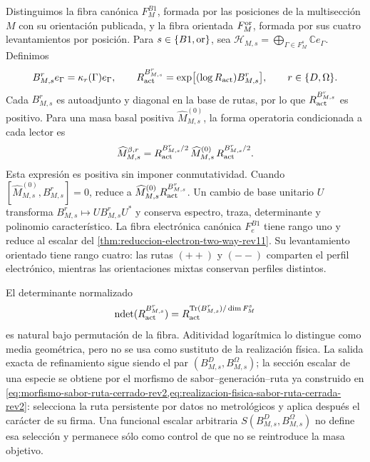 Distinguimos la fibra canónica \(F_M^{B1}\), formada por las posiciones de
la multisección \(M\) con su orientación publicada, y la fibra orientada
\(F_M^{\rm or}\), formada por sus cuatro levantamientos por posición. Para
\(s\in\{B1,{\rm or}\}\), sea
\(\mathcal H_{M,s}=\bigoplus_{\Gamma\in F_M^s}\mathbb C e_\Gamma\). Definimos
\begin{equation}
 B_{M,s}^r e_\Gamma=\kappa_r(\Gamma)e_\Gamma,
 \qquad
 R_{\rm act}^{B_{M,s}^r}
 =\exp\bigl[(\log R_{\rm act})B_{M,s}^r\bigr],
 \qquad r\in\{D,\Omega\}.
 \label{eq:operadores-fibra-two-way-rev11}
\end{equation}
Cada \(B_{M,s}^r\) es autoadjunto y diagonal en la base de rutas, por lo que
\(R_{\rm act}^{B_{M,s}^r}\) es positivo. Para una masa basal positiva
\(\widehat M_{M,s}^{(0)}\), la forma operatoria condicionada a cada lector es
\begin{equation}
 \widehat M_{M,s}^{\beta,r}
 =R_{\rm act}^{B_{M,s}^r/2}\,
  \widehat M_{M,s}^{(0)}\,
  R_{\rm act}^{B_{M,s}^r/2}.
 \label{eq:ley-operatoria-fibra-rev11}
\end{equation}
Esta expresión es positiva sin imponer conmutatividad. Cuando
\([\widehat M_{M,s}^{(0)},B_{M,s}^r]=0\), reduce a
\(\widehat M_{M,s}^{(0)}R_{\rm act}^{B_{M,s}^r}\).
Un cambio de base unitario \(U\) transforma
\(B_{M,s}^r\mapsto UB_{M,s}^rU^*\) y conserva espectro, traza, determinante y
polinomio característico. La fibra electrónica canónica \(F_e^{B1}\) tiene
rango uno y reduce al escalar del
\cref{thm:reduccion-electron-two-way-rev11}.
Su levantamiento orientado tiene rango cuatro: las rutas \((++)\) y \((--)\)
comparten el perfil electrónico, mientras las orientaciones mixtas conservan
perfiles distintos.

El determinante normalizado
\[
 \operatorname{ndet}(R_{\rm act}^{B_{M,s}^r})
 =R_{\rm act}^{\operatorname{Tr}(B_{M,s}^r)/\dim F_M^s}
\]
es natural bajo permutación de la fibra. Aditividad logarítmica lo distingue
como media geométrica, pero no se usa como sustituto de la realización física.
La salida exacta de refinamiento sigue siendo el par
\((B_{M,s}^D,B_{M,s}^\Omega)\); la sección escalar de una especie se obtiene
por el morfismo de sabor--generación--ruta ya construido en
\cref{eq:morfismo-sabor-ruta-cerrado-rev2,eq:realizacion-fisica-sabor-ruta-cerrada-rev2}:
selecciona la ruta persistente por datos no metrológicos y aplica después el
carácter de su firma. Una funcional escalar arbitraria
\(S(B_{M,s}^D,B_{M,s}^\Omega)\) no define esa selección y permanece sólo como
control de que no se reintroduce la masa objetivo.

